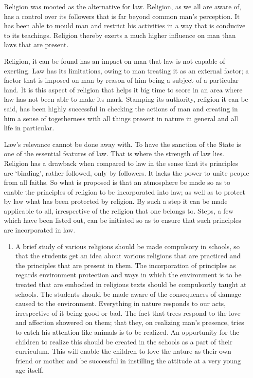 \begin{multicols}{2}
\vspace{-.2cm}


\vspace{-.1cm}

\noi
Religion was mooted as the alternative for law. Religion, as we all are aware of, has a control
over its followers that is far beyond common man’s perception. It has been able to mould man
and restrict his activities in a way that is conducive to its teachings. Religion thereby exerts a
much higher influence on man than laws that are present.

\noi
Religion, it can be found has an impact on man that law is not capable of exerting. Law has
its limitations, owing to man treating it as an external factor; a factor that is imposed on man
by reason of him being a subject of a particular land. It is this aspect of religion that helps it
big time to score in an area where law has not been able to make its mark. Stamping its
authority, religion it can be said, has been highly successful in checking the actions of man and
creating in him a sense of togetherness with all things present in nature in general and all life
in particular.


Law’s relevance cannot be done away with. To have the sanction of the State is one of the
essential features of law. That is where the strength of law lies. Religion has a drawback when
compared to law in the sense that its principles are ‘binding’, rather followed, only by
followers. It lacks the power to unite people from all faiths. So what is proposed is that an 
atmosphere be made so as to enable the principles of religion to be incorporated into law; as
well as to protect by law what has been protected by religion. By such a step it can be made
applicable to all, irrespective of the religion that one belongs to. Steps, a few which have been
listed out, can be initiated so as to ensure that such principles are incorporated in law.

\begin{enumerate}[label=$\bullet$]
\item A brief study of various religions should be made compulsory in schools, so that the
students get an idea about various religions that are practiced and the principles that are
present in them. The incorporation of principles as regards environment protection and
ways in which the environment is to be treated that are embodied in religious texts
should be compulsorily taught at schools. The students should be made aware of the
consequences of damage caused to the environment. Everything in nature responds to
our acts, irrespective of it being good or bad. The fact that trees respond to the love and
affection showered on them; that they, on realizing man’s presence, tries to catch his
attention like animals is to be realized. An opportunity for the children to realize this
should be created in the schools as a part of their curriculum. This will enable the
children to love the nature as their own friend or mother and be successful in instilling
the attitude at a very young age itself.


\end{enumerate}
\end{multicols}
